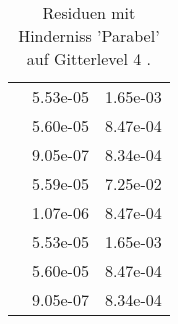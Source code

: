 \begin{table}
\begin{tabular}{c|cc|}
\multicolumn{1}{|c|}{} & \multicolumn{1}{|c|}{  5.53e-05} & \multicolumn{1}{|c|}{  1.65e-03} \\ 
\multicolumn{1}{|c|}{} & \multicolumn{1}{|c|}{  5.60e-05} & \multicolumn{1}{|c|}{  8.47e-04} \\ 
\multicolumn{1}{|c|}{} & \multicolumn{1}{|c|}{  9.05e-07} & \multicolumn{1}{|c|}{  8.34e-04} \\ 
\multicolumn{1}{|c|}{} & \multicolumn{1}{|c|}{  5.59e-05} & \multicolumn{1}{|c|}{  7.25e-02} \\ 
\multicolumn{1}{|c|}{} & \multicolumn{1}{|c|}{  1.07e-06} & \multicolumn{1}{|c|}{  8.47e-04} \\ 
\multicolumn{1}{|c|}{} & \multicolumn{1}{|c|}{  5.53e-05} & \multicolumn{1}{|c|}{  1.65e-03} \\ 
\multicolumn{1}{|c|}{} & \multicolumn{1}{|c|}{  5.60e-05} & \multicolumn{1}{|c|}{  8.47e-04} \\ 
\multicolumn{1}{|c|}{} & \multicolumn{1}{|c|}{  9.05e-07} & \multicolumn{1}{|c|}{  8.34e-04} \\ 
\hline 
\end{tabular}\caption{Residuen mit Hinderniss 'Parabel' auf Gitterlevel 4 .}\label{tab:Residuum_Parabel_level4}
\end{table} 
